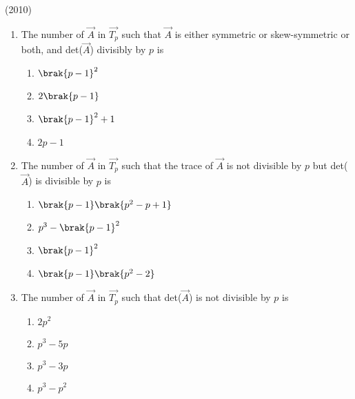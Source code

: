 \begin{enumerate}
			\hfill(2010)
	
	\begin{enumerate}
		\item The number of $\vec{A}$ in $\vec{T_p}$ such that $\vec{A}$ is either symmetric or skew-symmetric or both, and det($\vec{A}$) divisibly by $p$ is
			\begin{enumerate}
				\item $\brak{p-1}^2$
				\item $2\brak{p-1}$
				\item $\brak{p-1}^2+1$
				\item $2p-1$
			\end{enumerate}


		\item The number of $\vec{A}$ in $\vec{T_p}$ such that the trace of $\vec{A}$ is not divisible by $p$ but det($\vec{A}$) is divisible by $p$ is

			
			\begin{enumerate}
				\item $\brak{p-1}\brak{p^2-p+1}$
				\item $p^3-\brak{p-1}^2$
				\item $\brak{p-1}^2$
				\item $\brak{p-1}\brak{p^2-2}$
			\end{enumerate}

		\item The number of $\vec{A}$ in $\vec{T_p}$ such that det($\vec{A}$) is not divisible by $p$ is 
			\begin{enumerate}
				\item $2p^2$
				\item $p^3-5p$
				\item $p^3-3p$
				\item $p^3-p^2$
			\end{enumerate}


\end{enumerate}
\end{enumerate}
